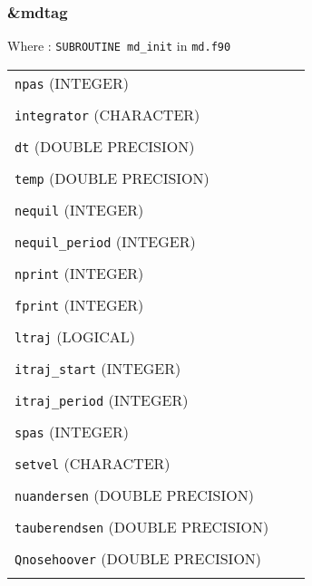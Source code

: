 \documentclass[10pt,a4paper]{article}
\begin{document}
\subsubsection{\&mdtag}

Where : \verb?SUBROUTINE md_init? in \verb?md.f90?

\begin{tabular}{lcc}
\\
\verb?npas? (INTEGER)  & \\
\\
\verb?integrator? (CHARACTER)  & \\
\\
\verb?dt? (DOUBLE PRECISION)  & \\
\\
\verb?temp? (DOUBLE PRECISION)  & \\
\\
\verb?nequil? (INTEGER)  & \\
\\
\verb?nequil_period? (INTEGER) & \\
\\
\verb?nprint? (INTEGER) & \\
\\
\verb?fprint? (INTEGER) & \\
\\
\verb?ltraj? (LOGICAL) & \\
\\
\verb?itraj_start? (INTEGER) & \\
\\
\verb?itraj_period? (INTEGER) & \\
\\
\verb?spas? (INTEGER) & \\
\\
\verb?setvel? (CHARACTER) & \\
\\
\verb?nuandersen? (DOUBLE PRECISION) & \\
\\
\verb?tauberendsen? (DOUBLE PRECISION) & \\
\\
\verb?Qnosehoover? (DOUBLE PRECISION) & \\
\\
\end{tabular}

\end{document}
